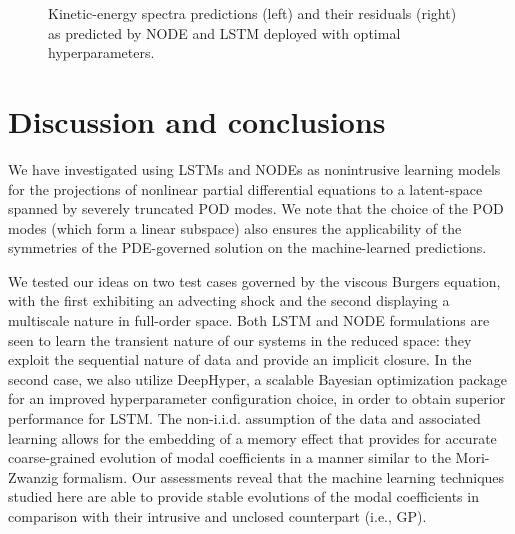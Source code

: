 \documentclass[preprint,12pt]{elsarticle}
\begin{document}
\begin{figure}
	\centering
	\caption{Kinetic-energy spectra predictions (left) and their residuals (right) as predicted by NODE and LSTM deployed with optimal hyperparameters.}
	\label{Figure18}
\end{figure}


\section{Discussion and conclusions}

We have investigated using LSTMs and NODEs as nonintrusive learning models for the projections of nonlinear partial differential equations to a latent-space spanned by severely truncated POD modes. We note that the choice of the POD modes (which form a linear subspace) also ensures the applicability of the symmetries of the PDE-governed solution on the machine-learned predictions.

We tested our ideas on two test cases governed by the viscous Burgers equation, with the first exhibiting an advecting shock and the second displaying a multiscale nature in full-order space. Both LSTM and NODE formulations are seen to learn the transient nature of our systems in the reduced space: they exploit the sequential nature of data and provide an implicit closure. In the second case, we also utilize DeepHyper, a scalable Bayesian optimization package for an improved hyperparameter configuration choice, in order to obtain superior performance for LSTM. The non-i.i.d. assumption of the data and associated learning allows for the embedding of a memory effect that provides for accurate coarse-grained evolution of modal coefficients in a manner similar to the Mori-Zwanzig formalism. Our assessments reveal that the machine learning techniques studied here are able to provide stable evolutions of the modal coefficients in comparison with their intrusive and unclosed counterpart (i.e., GP). 
\end{document}
